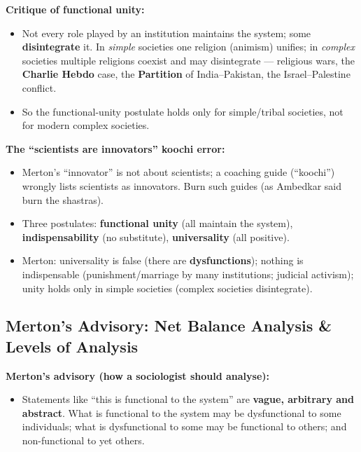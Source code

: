 \begin{CriticalPoint}
\textbf{Critique of functional unity:}
\begin{itemize}
\item Not every role played by an institution maintains the system; some \textbf{disintegrate} it. In \textit{simple} societies one religion (animism) unifies; in \textit{complex} societies multiple religions coexist and may disintegrate --- religious wars, the \textbf{Charlie Hebdo} case, the \textbf{Partition} of India--Pakistan, the Israel--Palestine conflict.
\item So the functional-unity postulate holds only for simple/tribal societies, not for modern complex societies.
\end{itemize}
\end{CriticalPoint}

\begin{CriticalPoint}
\textbf{The ``scientists are innovators'' koochi error:}
\begin{itemize}
\item Merton's ``innovator'' is not about scientists; a coaching guide (``koochi'') wrongly lists scientists as innovators. Burn such guides (as Ambedkar said burn the shastras).
\end{itemize}
\end{CriticalPoint}

\begin{QuickRevision}
\begin{itemize}
\item Three postulates: \textbf{functional unity} (all maintain the system), \textbf{indispensability} (no substitute), \textbf{universality} (all positive).
\item Merton: universality is false (there are \textbf{dysfunctions}); nothing is indispensable (punishment/marriage by many institutions; judicial activism); unity holds only in simple societies (complex societies disintegrate).
\end{itemize}
\end{QuickRevision}

\sectiondivider

\subsection{Merton's Advisory: Net Balance Analysis \& Levels of Analysis}

\begin{KeyConcept}
\textbf{Merton's advisory (how a sociologist should analyse):}
\begin{itemize}
\item Statements like ``this is functional to the system'' are \textbf{vague, arbitrary and abstract}. What is functional to the system may be dysfunctional to some individuals; what is dysfunctional to some may be functional to others; and non-functional to yet others.
\end{itemize}
\end{KeyConcept}

